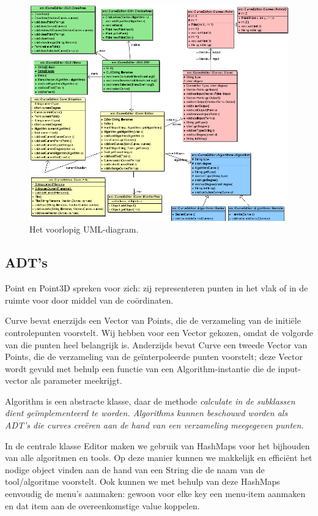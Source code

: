 \documentclass[a4paper,11pt,oneside, titlepage]{article}
\begin{document}
\begin{figure}[hbp]
\center
\includegraphics[scale=0.50]{uml.png}
\caption{Het voorlopig UML-diagram.}
\end{figure}
\clearpage

\subsection{ADT's}
Point en Point3D spreken voor zich: zij representeren punten in het vlak of in de ruimte voor door middel van de co\"ordinaten.

Curve bevat enerzijds een Vector van Points, die de verzameling van de initi\"ele controlepunten voorstelt. Wij hebben voor een Vector gekozen, omdat de volgorde van die punten heel belangrijk is. Anderzijds bevat Curve een tweede Vector van Points, die de verzameling van de ge\"interpoleerde punten voorstelt; deze Vector wordt gevuld met behulp een functie van een Algorithm-instantie die de input-vector als parameter meekrijgt.

Algorithm is een abstracte klasse, daar de methode \it{calculate} \rm{in} de subklassen dient ge\"implementeerd te worden. Algorithms kunnen beschouwd worden als ADT's die curves cre\"eren aan de hand van een verzameling meegegeven punten.

In de centrale klasse Editor maken we gebruik van HashMaps voor het bijhouden van alle algoritmen en tools. Op deze manier kunnen we makkelijk en effici\"ent het nodige object vinden aan de hand van een String die de naam van de tool/algoritme voorstelt. Ook kunnen we met behulp van deze HashMaps eenvoudig de menu's aanmaken: gewoon voor elke key een menu-item aanmaken en dat item aan de overeenkomstige value koppelen.
\end{document}
